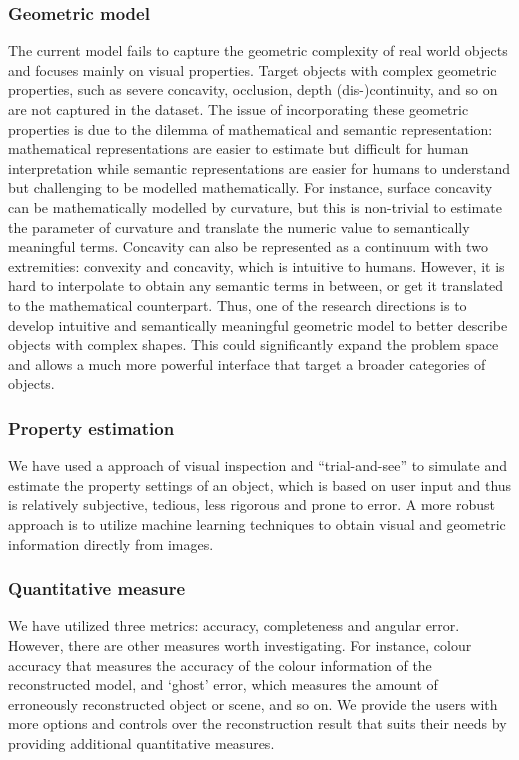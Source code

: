 \subsubsection{Geometric model}
The current model fails to capture the geometric complexity of real world objects and focuses mainly on visual properties. Target objects with complex geometric properties, such as severe concavity, occlusion, depth (dis-)continuity, and so on are not captured in the dataset. The issue of incorporating these geometric properties is due to the dilemma of mathematical and semantic representation: mathematical representations are easier to estimate but difficult for human interpretation while semantic representations are easier for humans to understand but challenging to be modelled mathematically. For instance, surface concavity can be mathematically modelled by curvature, but this is non-trivial to estimate the parameter of curvature and translate the numeric value to semantically meaningful terms. Concavity can also be represented as a continuum with two extremities: convexity and concavity, which is intuitive to humans. However, it is hard to interpolate to obtain any semantic terms in between, or get it translated to the mathematical counterpart. Thus, one of the research directions is to develop intuitive and semantically meaningful geometric model to better describe objects with complex shapes. This could significantly expand the problem space and allows a much more powerful interface that target a broader categories of objects.

\subsubsection{Property estimation}
We have used a approach of visual inspection and ``trial-and-see'' to simulate and estimate the property settings of an object, which is based on user input and thus is relatively subjective, tedious, less rigorous and prone to error. A more robust approach is to utilize machine learning techniques to obtain visual and geometric information directly from images.

\subsubsection{Quantitative measure}
We have utilized three metrics: accuracy, completeness and angular error. However, there are other measures worth investigating. For instance, colour accuracy that measures the accuracy of the colour information of the reconstructed model, and `ghost' error, which measures the amount of erroneously reconstructed object or scene, and so on. We provide the users with more options and controls over the reconstruction result that suits their needs by providing additional quantitative measures.

